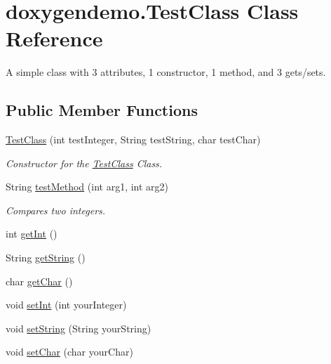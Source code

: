 \hypertarget{classdoxygendemo_1_1_test_class}{}\section{doxygendemo.\+Test\+Class Class Reference}
\label{classdoxygendemo_1_1_test_class}


A simple class with 3 attributes, 1 constructor, 1 method, and 3 gets/sets.  


\subsection*{Public Member Functions}
\begin{DoxyCompactItemize}
\item 
\hyperlink{classdoxygendemo_1_1_test_class_a5867d4c3f773668e6c1340e8135bd136}{Test\+Class} (int test\+Integer, String test\+String, char test\+Char)
\begin{DoxyCompactList}\small\item\em Constructor for the \hyperlink{classdoxygendemo_1_1_test_class}{Test\+Class} Class. \end{DoxyCompactList}\item 
String \hyperlink{classdoxygendemo_1_1_test_class_abbd911a5398278ff404a9f08935debbb}{test\+Method} (int arg1, int arg2)
\begin{DoxyCompactList}\small\item\em Compares two integers. \end{DoxyCompactList}\item 
int \hyperlink{classdoxygendemo_1_1_test_class_a70371a9bd69ded1856d919c36bd2f217}{get\+Int} ()
\item 
String \hyperlink{classdoxygendemo_1_1_test_class_ae17e0f53c5f1a33316cf76c7641f3ce4}{get\+String} ()
\item 
char \hyperlink{classdoxygendemo_1_1_test_class_a46cf9baec135f19f9eb7dc01e1c0c126}{get\+Char} ()
\item 
void \hyperlink{classdoxygendemo_1_1_test_class_ac478dea45796d1b1dc1acf230c8d4263}{set\+Int} (int your\+Integer)
\item 
void \hyperlink{classdoxygendemo_1_1_test_class_a0da9db140c2b9cad94632c4a2f8a1081}{set\+String} (String your\+String)
\item 
void \hyperlink{classdoxygendemo_1_1_test_class_a8a38375f77528de05eee5adfe614560f}{set\+Char} (char your\+Char)
\end{DoxyCompactItemize}


